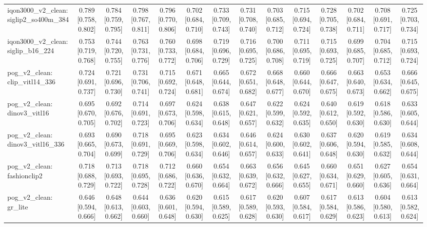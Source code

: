 \begin{table}[t]
\begin{tabular}{lccccccccccccc}
iqon3000\_v2\_clean: siglip2\_so400m\_384 & 0.789 [0.758, 0.802] & 0.784 [0.759, 0.795] & 0.798 [0.767, 0.811] & 0.796 [0.770, 0.806] & 0.702 [0.684, 0.710] & 0.733 [0.709, 0.743] & 0.731 [0.708, 0.740] & 0.703 [0.685, 0.712] & 0.715 [0.694, 0.724] & 0.728 [0.705, 0.738] & 0.702 [0.684, 0.711] & 0.708 [0.691, 0.717] & 0.725 [0.703, 0.734] \\
iqon3000\_v2\_clean: siglip\_b16\_224 & 0.753 [0.719, 0.768] & 0.744 [0.720, 0.755] & 0.763 [0.731, 0.776] & 0.760 [0.733, 0.772] & 0.698 [0.684, 0.706] & 0.719 [0.696, 0.729] & 0.716 [0.695, 0.725] & 0.700 [0.686, 0.708] & 0.711 [0.695, 0.719] & 0.715 [0.693, 0.725] & 0.699 [0.685, 0.707] & 0.704 [0.685, 0.712] & 0.715 [0.693, 0.724] \\
pog\_v2\_clean: clip\_vitl14\_336 & 0.724 [0.691, 0.737] & 0.721 [0.696, 0.730] & 0.731 [0.706, 0.741] & 0.715 [0.692, 0.724] & 0.671 [0.648, 0.681] & 0.665 [0.644, 0.674] & 0.672 [0.651, 0.682] & 0.668 [0.648, 0.677] & 0.660 [0.644, 0.670] & 0.666 [0.647, 0.675] & 0.663 [0.640, 0.673] & 0.653 [0.634, 0.662] & 0.666 [0.645, 0.675] \\
pog\_v2\_clean: dinov3\_vitl16 & 0.695 [0.670, 0.705] & 0.692 [0.676, 0.702] & 0.714 [0.691, 0.723] & 0.697 [0.673, 0.706] & 0.624 [0.598, 0.634] & 0.638 [0.615, 0.648] & 0.647 [0.621, 0.657] & 0.622 [0.599, 0.632] & 0.624 [0.592, 0.635] & 0.640 [0.612, 0.650] & 0.619 [0.592, 0.630] & 0.618 [0.586, 0.630] & 0.633 [0.605, 0.644] \\
pog\_v2\_clean: dinov3\_vitl16\_336 & 0.693 [0.665, 0.704] & 0.690 [0.673, 0.699] & 0.718 [0.691, 0.729] & 0.695 [0.669, 0.706] & 0.623 [0.598, 0.634] & 0.634 [0.602, 0.646] & 0.646 [0.614, 0.657] & 0.624 [0.600, 0.633] & 0.630 [0.602, 0.641] & 0.637 [0.606, 0.648] & 0.620 [0.594, 0.630] & 0.619 [0.585, 0.632] & 0.634 [0.608, 0.644] \\
pog\_v2\_clean: fashionclip2 & 0.718 [0.688, 0.729] & 0.713 [0.693, 0.722] & 0.718 [0.695, 0.728] & 0.712 [0.686, 0.722] & 0.660 [0.636, 0.670] & 0.654 [0.632, 0.664] & 0.663 [0.639, 0.672] & 0.656 [0.632, 0.666] & 0.645 [0.627, 0.655] & 0.660 [0.634, 0.671] & 0.651 [0.629, 0.660] & 0.627 [0.605, 0.636] & 0.654 [0.631, 0.664] \\
pog\_v2\_clean: gr\_lite & 0.646 [0.594, 0.666] & 0.648 [0.613, 0.662] & 0.644 [0.603, 0.660] & 0.636 [0.601, 0.648] & 0.620 [0.594, 0.630] & 0.615 [0.589, 0.625] & 0.617 [0.589, 0.628] & 0.620 [0.593, 0.630] & 0.607 [0.584, 0.617] & 0.617 [0.584, 0.629] & 0.613 [0.586, 0.623] & 0.604 [0.580, 0.613] & 0.613 [0.582, 0.624] \\

\end{tabular}
\end{table}
